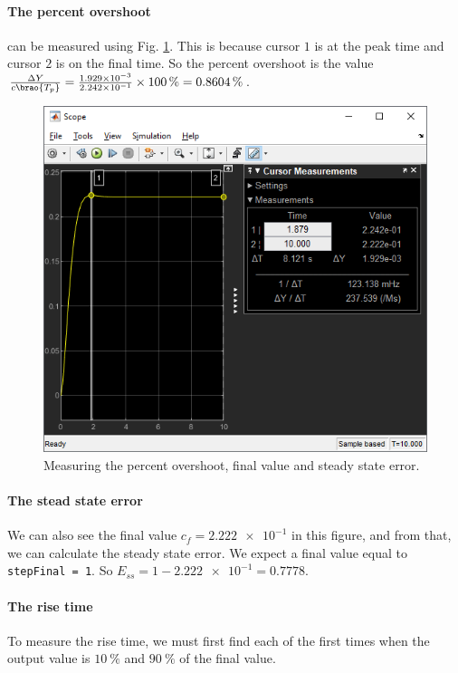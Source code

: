 \documentclass[12pt]{article}
\DeclarePairedDelimiter\brao()%
\begin{document}
\paragraph{The percent overshoot} can be measured using Fig. \ref{fig:step - measuring percent overshoot}.
This is because cursor $1$ is at the peak time and cursor $2$ is on the final time.
So the percent overshoot is the value $\frac{\Delta Y}{c\brao{T_p}} = \frac{\num{1.929e-03}}{\num{2.242e-1}}\times\SI{100}\percent = \SI{0.8604}\percent$.
 
\begin{figure}[h]
    \centering
    \includegraphics[width=\linewidth]{part01a_measuring_pcOS.png}
    \caption{Measuring the percent overshoot, final value and steady state error.}
    \label{fig:step - measuring percent overshoot}
\end{figure}

\paragraph{The stead state error}
We can also see the final value $c_f = \num{2.222e-1}$ in this figure,
and from that, we can calculate the steady state error.
We expect a final value equal to \texttt{stepFinal = 1}.
So $E_{ss} = 1 - \num{2.222e-1} = 0.7778$.

\paragraph{The rise time} To measure the rise time,
we must first find each of the first times when the output value is $\SI{10}\percent$ and $\SI{90}\percent$
of the final value.
\end{document}
